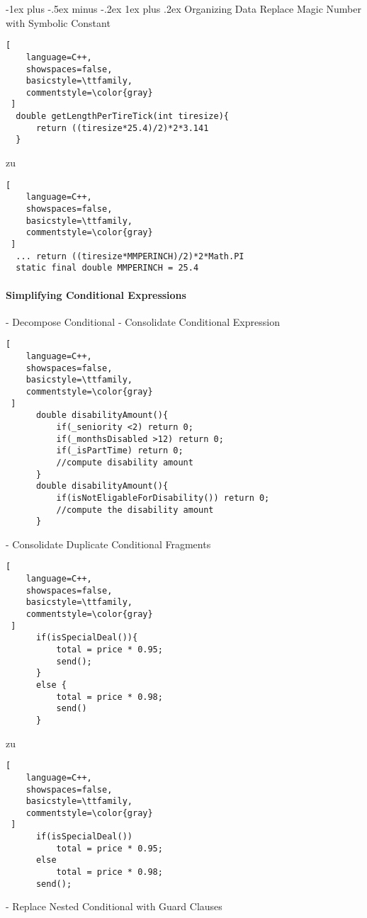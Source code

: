 \documentclass[a4paper]{article}
\makeatletter
\renewcommand{\subsubsection}{\@startsection{subsubsection}{3}{0mm}%
                                {-1ex plus -.5ex minus -.2ex}%
                                {1ex plus .2ex}%
                                {\normalfont\small\bfseries}}
\makeatother
\begin{document}
\begin{multicols}{3}
  \subsubsection{Organizing Data}
  Replace Magic Number with Symbolic Constant
  
  \begin{lstlisting}[
    language=C++,
    showspaces=false,
    basicstyle=\ttfamily,
    commentstyle=\color{gray}
 ]
  double getLengthPerTireTick(int tiresize){
      return ((tiresize*25.4)/2)*2*3.141
  }
  \end{lstlisting}
  zu
  
  \begin{lstlisting}[
    language=C++,
    showspaces=false,
    basicstyle=\ttfamily,
    commentstyle=\color{gray}
 ]
  ... return ((tiresize*MMPERINCH)/2)*2*Math.PI
  static final double MMPERINCH = 25.4
  \end{lstlisting}
  
  \paragraph{Simplifying Conditional Expressions}
  - Decompose Conditional
  - Consolidate Conditional Expression
      
  \begin{lstlisting}[
    language=C++,
    showspaces=false,
    basicstyle=\ttfamily,
    commentstyle=\color{gray}
 ]
      double disabilityAmount(){
          if(_seniority <2) return 0;
          if(_monthsDisabled >12) return 0;
          if(_isPartTime) return 0;
          //compute disability amount
      }
      double disabilityAmount(){
          if(isNotEligableForDisability()) return 0;
          //compute the disability amount
      }
      \end{lstlisting}
  - Consolidate Duplicate Conditional Fragments
      
  \begin{lstlisting}[
    language=C++,
    showspaces=false,
    basicstyle=\ttfamily,
    commentstyle=\color{gray}
 ]
      if(isSpecialDeal()){
          total = price * 0.95;
          send();
      }
      else {
          total = price * 0.98;
          send()
      }
      \end{lstlisting}
      zu
      
  \begin{lstlisting}[
    language=C++,
    showspaces=false,
    basicstyle=\ttfamily,
    commentstyle=\color{gray}
 ]
      if(isSpecialDeal())
          total = price * 0.95;
      else
          total = price * 0.98;
      send();
      \end{lstlisting}
  - Replace Nested Conditional with Guard Clauses
      

\end{multicols}
\end{document}
